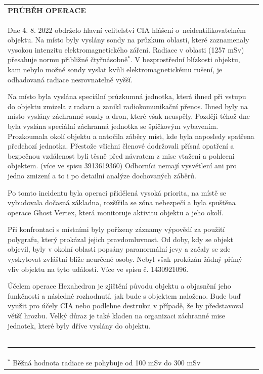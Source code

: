 \documentclass[a4paper, 11pt]{article}
\newlength{\fontheight}
\def\bottomrulewidth{0.3mm}		%
\def\tabtitleextraheight{5pt}	%
\def\tablestretch{1.4}			%
\newcommand{\blackcell}{\cellcolor{black} \color{white} \ttfamily \bfseries}
\newcommand{\tabtitle}[2]{\multicolumn{#1}{l}{\blackcell \MakeUppercase{#2}\rule{0pt}{\dimexpr \fontheight + 1pt + \tabtitleextraheight \relax} } \\ [\tabtitleextraheight]}
\newcommand{\ind}{\hspace*{8mm}}
\begin{document}
	\begin{table}[H]
		\renewcommand\tabularxcolumn[1]{m{#1}}
		\def\arraystretch{\tablestretch}
		\begin{tabularx}{\textwidth}{X}
			\tabtitle{1}{průběh operace}
		\ttfamily
		\ind Dne 4. 8. 2022 obdrželo hlavní velitelství CIA hlášení o~neidentifikovatelném objektu. Na místo byly vyslány sondy na průzkum oblasti, které zaznamenaly vysokou intenzitu elektromagnetického záření. Radiace v oblasti (1257 mSv) přesahuje normu přibližné čtyřnásobně$^*$. V bezprostřední blízkosti objektu, kam nebylo možné sondy vyslat kvůli elektromagnetickému rušení, je odhadovaná radiace nesrovnatelně vyšší.
		
		\ind Na místo byla vyslána speciální průzkumná jednotka, která ihned při vstupu do objektu zmizela z radaru a zanikl radiokomunikační přenos. Ihned byly na místo vyslány záchranné sondy a dron, které však neuspěly. Později téhož dne byla vyslána speciální záchranná jednotka se špičkovým vybavením. Prozkoumala okolí objektu a natočila záběry míst, kde byla naposledy spatřena předchozí jednotka. Přestože všichni členové dodržovali přísná opatření a bezpečnou vzdálenost byli těsně před návratem z mise vtaženi a pohlceni objektem. (více ve spisu 3913619360) Odborníci nemají vysvětlení ani pro jedno zmizení a to i po detailní analýze dochovaných záběrů.
		
		\ind Po tomto incidentu byla operaci přidělená vysoká priorita, na místě se vybudovala dočasná základna, rozšířila se zóna nebezpečí a byla spuštěna operace Ghost Vertex, která monitoruje aktivitu objektu a jeho okolí.
		
		\ind Při konfrontaci s místními byly pořízeny záznamy výpovědí za použití polygrafu, který prokázal jejich pravdomluvnost. Od doby, kdy se objekt objevil, byly v okolní oblasti popsány paranormální jevy a začaly se zde vyskytovat zvláštní blíže neurčené osoby. Nebyl však prokázán žádný přímý vliv objektu na tyto události. Více ve spisu č. 1430921096.
		
		\ind Účelem operace Hexahedron je zjištění původu objektu a objasnění jeho funkčnosti a následné rozhodnutí, jak bude s objektem naloženo. Bude buď využit pro účely CIA nebo podlehne destrukci v případě, že by představoval větší hrozbu. Velký důraz je také kladen na organizaci záchranné mise jednotek, které byly dříve vyslány do objektu.\\ \bottomrule[\bottomrulewidth]
		\rule{7cm}{0.1mm} \\[-1.5ex]
		\footnotesize $^*$ Běžná hodnota radiace se pohybuje od 100 mSv do 300 mSv \\
		\end{tabularx}
	\end{table}
	
\end{document}
